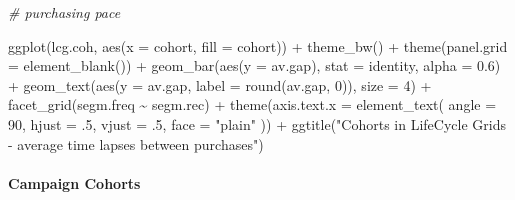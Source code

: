 \documentclass[
]{book}
\newenvironment{Shaded}{\begin{snugshade}}{\end{snugshade}}
\newcommand{\AttributeTok}[1]{\textcolor[rgb]{0.77,0.63,0.00}{#1}}
\newcommand{\CommentTok}[1]{\textcolor[rgb]{0.56,0.35,0.01}{\textit{#1}}}
\newcommand{\DecValTok}[1]{\textcolor[rgb]{0.00,0.00,0.81}{#1}}
\newcommand{\FloatTok}[1]{\textcolor[rgb]{0.00,0.00,0.81}{#1}}
\newcommand{\FunctionTok}[1]{\textcolor[rgb]{0.00,0.00,0.00}{#1}}
\newcommand{\NormalTok}[1]{#1}
\newcommand{\SpecialCharTok}[1]{\textcolor[rgb]{0.00,0.00,0.00}{#1}}
\newcommand{\StringTok}[1]{\textcolor[rgb]{0.31,0.60,0.02}{#1}}
\begin{document}
\begin{Shaded}
\begin{Highlighting}[]
\CommentTok{\# purchasing pace}

\FunctionTok{ggplot}\NormalTok{(lcg.coh, }\FunctionTok{aes}\NormalTok{(}\AttributeTok{x =}\NormalTok{ cohort, }\AttributeTok{fill =}\NormalTok{ cohort)) }\SpecialCharTok{+}
    \FunctionTok{theme\_bw}\NormalTok{() }\SpecialCharTok{+}
    \FunctionTok{theme}\NormalTok{(}\AttributeTok{panel.grid =} \FunctionTok{element\_blank}\NormalTok{()) }\SpecialCharTok{+}
    \FunctionTok{geom\_bar}\NormalTok{(}\FunctionTok{aes}\NormalTok{(}\AttributeTok{y =}\NormalTok{ av.gap), }\AttributeTok{stat =} \StringTok{\textquotesingle{}identity\textquotesingle{}}\NormalTok{, }\AttributeTok{alpha =} \FloatTok{0.6}\NormalTok{) }\SpecialCharTok{+}
    \FunctionTok{geom\_text}\NormalTok{(}\FunctionTok{aes}\NormalTok{(}\AttributeTok{y =}\NormalTok{ av.gap, }\AttributeTok{label =} \FunctionTok{round}\NormalTok{(av.gap, }\DecValTok{0}\NormalTok{)), }\AttributeTok{size =} \DecValTok{4}\NormalTok{) }\SpecialCharTok{+}
    \FunctionTok{facet\_grid}\NormalTok{(segm.freq }\SpecialCharTok{\textasciitilde{}}\NormalTok{ segm.rec) }\SpecialCharTok{+}
    \FunctionTok{theme}\NormalTok{(}\AttributeTok{axis.text.x =} \FunctionTok{element\_text}\NormalTok{(}
        \AttributeTok{angle =} \DecValTok{90}\NormalTok{,}
        \AttributeTok{hjust =}\NormalTok{ .}\DecValTok{5}\NormalTok{,}
        \AttributeTok{vjust =}\NormalTok{ .}\DecValTok{5}\NormalTok{,}
        \AttributeTok{face =} \StringTok{"plain"}
\NormalTok{    )) }\SpecialCharTok{+}
    \FunctionTok{ggtitle}\NormalTok{(}\StringTok{"Cohorts in LifeCycle Grids {-} average time lapses between purchases"}\NormalTok{)}
\end{Highlighting}
\end{Shaded}

\hypertarget{campaign-cohorts}{%
\paragraph{Campaign Cohorts}\label{campaign-cohorts}}
\end{document}
